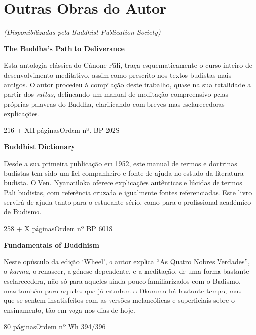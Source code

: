 \chapter{Outras Obras do Autor}

{\centering
  \emph{(Disponibilizadas pela Buddhist Publication Society)}
\par}

\bigskip

\textbf{The Buddha's Path to Deliverance}

Esta antologia clássica do Cânone Pāli, traça esquematicamente o curso inteiro de desenvolvimento meditativo, assim como prescrito nos textos budistas mais antigos. O autor procedeu à compilação deste trabalho, quase na sua totalidade a partir dos \emph{suttas}, delineando um manual de meditação compreensivo pelas próprias palavras do Buddha, clarificando com breves mas esclarecedoras explicações.

216 + XII páginas\hfill Ordem nº. BP 202S

\bigskip

\textbf{Buddhist Dictionary}

Desde a sua primeira publicação em 1952, este manual de termos e doutrinas
budistas tem sido um fiel companheiro e fonte de ajuda no estudo da literatura
budista. O Ven. Nyanatiloka oferece explicações autênticas e lúcidas de termos
Pāli budistas, com referência cruzada e igualmente fontes referenciadas. Este
livro servirá de ajuda tanto para o estudante sério, como para o profissional
académico de Budismo.

258 + X páginas\hfill Ordem nº BP 601S

\clearpage

\textbf{Fundamentals of Buddhism}

Neste opúsculo da edição ‘Wheel’, o autor explica “As Quatro Nobres Verdades”,
o \emph{karma}, o renascer, a génese dependente, e a meditação, de uma forma
bastante esclarecedora, não só para aqueles ainda pouco familiarizados com o
Budismo, mas também para aqueles que já estudam o Dhamma há bastante
tempo, mas que se sentem insatisfeitos com as versões melancólicas e
superficiais sobre o ensinamento, tão em voga nos dias de hoje.

80 páginas\hfill Ordem nº Wh 394/396

